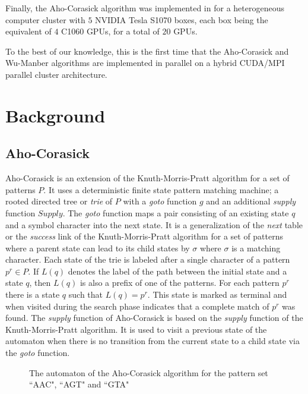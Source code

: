 \documentclass{ws-ijait}
\begin{document}
Finally, the Aho-Corasick algorithm was implemented in \cite{Tumeo2012} for a heterogeneous computer cluster with $5$ NVIDIA Tesla S1070 boxes, each box being the equivalent of $4$ C1060 GPUs, for a total of $20$ GPUs.

To the best of our knowledge, this is the first time that the Aho-Corasick and Wu-Manber algorithms are implemented in parallel on a hybrid CUDA/MPI parallel cluster architecture.

\section{Background}
\label{sec:background}

\subsection{Aho-Corasick}

Aho-Corasick is an extension of the Knuth-Morris-Pratt algorithm for a set of patterns $P$. It uses a deterministic finite state pattern matching machine; a rooted directed tree or \textit{trie} of $P$ with a \textit{goto} function $g$ and an additional \textit{supply} function $Supply$. The \textit{goto} function maps a pair consisting of an existing state $q$ and a symbol character into the next state. It is a generalization of the \textit{next} table or the \textit{success} link of the Knuth-Morris-Pratt algorithm for a set of patterns where a parent state can lead to its child states by $\sigma$ where $\sigma$ is a matching character. Each state of the trie is labeled after a single character of a pattern $p^r \in P$. If $L(q)$ denotes the label of the path between the initial state and a state $q$, then $L(q)$ is also a prefix of one of the patterns. For each pattern $p^r$ there is a state $q$ such that $L(q) = p^r$. This state is marked as terminal and when visited during the search phase indicates that a complete match of $p^r$ was found. The \textit{supply} function of Aho-Corasick is based on the \textit{supply} function of the Knuth-Morris-Pratt algorithm. It is used to visit a previous state of the automaton when there is no transition from the current state to a child state via the \textit{goto} function.

\begin{figure}[h]
\centering
{}
  \caption[The automaton of the Aho-Corasick algorithm]{The automaton of the Aho-Corasick algorithm for the pattern set ``AAC", ``AGT" and ``GTA" }
  \label{fig:ACtransitiondiagram}
\end{figure}
\end{document}
